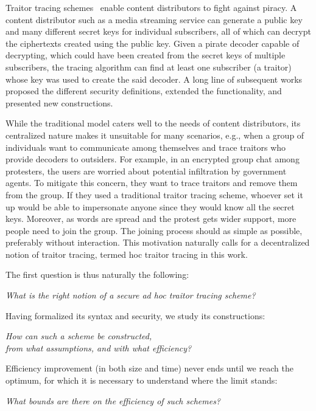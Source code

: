 Traitor tracing schemes~\cite{C:ChoFiaNao94} enable content distributors to fight against piracy.
A content distributor such as a media streaming service can generate a public key and many different secret keys for individual subscribers,
all of which can decrypt the ciphertexts created using the public key.
Given a pirate decoder capable of decrypting,
which could have been created from the secret keys of multiple subscribers,
the tracing algorithm can find at least one subscriber (a traitor) whose key was used to create the said decoder.
A long line of subsequent works~\cite{EC:BonSahWat06,CCS:BonWat06,CCS:BonNao08,C:BonZha14,EC:NisWicZha16,STOC:GoyKopWat18,C:GKRW18,TCC:CVWWW18,C:GQWW19,TCC:GoyKopWat19,C:Zhandry20,C:Zhandry21} proposed the different security definitions, extended the functionality, and presented new constructions.

While the traditional model caters well to the needs of content distributors,
its centralized nature makes it unsuitable for many scenarios,
e.g., when a group of individuals want to communicate among themselves and
trace traitors who provide decoders to outsiders.
For example,
in an encrypted group chat among protesters,
the users are worried about potential infiltration by government agents.
To mitigate this concern,
they want to trace traitors and remove them from the group.
If they used a traditional traitor tracing scheme,
whoever set it up would be able to impersonate anyone
since they would know all the secret keys.
Moreover, as words are spread and the protest gets wider support,
more people need to join the group.
The joining process should as simple as possible,
preferably without interaction.
This motivation naturally calls for a decentralized notion of traitor tracing, termed \ad hoc traitor tracing in this work.

The first question is thus naturally the following:
\begin{center}
\itshape
What is the right notion of a secure ad hoc traitor tracing scheme?\\
\end{center}
Having formalized its syntax and security,
we study its constructions:
\begin{center}
\itshape
How can such a scheme be constructed,\\
from what assumptions, and with what efficiency?
\end{center}
Efficiency improvement (in both size and time)
never ends until we reach the optimum,
for which it is necessary to understand where the limit stands:
\begin{center}
\itshape
What bounds are there on the efficiency of such schemes?
\end{center}
